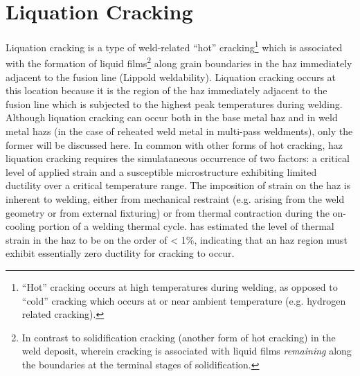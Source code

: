 \section{Liquation Cracking} \label{sec:liquation-cracking}
Liquation cracking is a type of weld-related “hot” cracking\footnote{“Hot” cracking occurs at high temperatures during welding, as opposed to “cold” cracking which occurs at or near ambient temperature (e.g. hydrogen related cracking).} which is associated with the formation of liquid films\footnote{In contrast to solidification cracking (another form of hot cracking) in the weld deposit, wherein cracking is associated with liquid films \emph{remaining} along the boundaries at the terminal stages of solidification.} along grain boundaries in the \gls{haz} immediately adjacent to the fusion line (Lippold weldability). Liquation cracking occurs at this location because it is the region of the \gls{haz} immediately adjacent to the fusion line which is subjected to the highest peak temperatures during welding. Although liquation cracking can occur both in the base metal \gls{haz} and in weld metal \gls{haz}s (in the case of reheated weld metal in multi-pass weldments), only the former will be discussed here. In common with other forms of hot cracking, \gls{haz} liquation cracking requires the simulataneous occurrence of two factors: a critical level of applied strain and a susceptible microstructure exhibiting limited ductility over a critical temperature range. The imposition of strain on the \gls{haz} is inherent to welding, either from mechanical restraint (e.g. arising from the weld geometry or from external fixturing) or from thermal contraction during the on-cooling portion of a welding thermal cycle. \citet{yeniscavich_correlation_1970} has estimated the level of thermal strain in the \gls{haz} to be on the order of < 1\%, indicating that an \gls{haz} region must exhibit essentially zero ductility for cracking to occur. 


